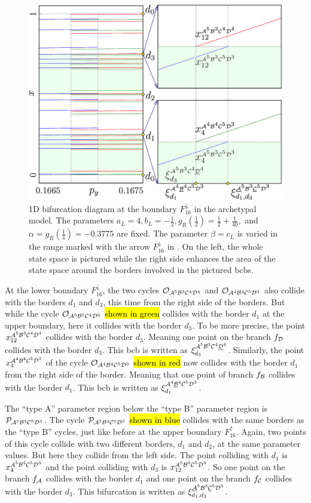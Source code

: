 \begin{figure}
	\centering
	\includegraphics[width=.7 \textwidth]{../Figures/6/6.7/result.png}
	\caption[1D bifurcation diagram at the boundary $F_{16}^\downarrow$ in the archetypal model]{
		1D bifurcation diagram at the boundary $F_{16}^\downarrow$ in the archetypal model.
		The parameters $a_L = 4, b_L = -\frac{1}{2}, g_R\left(\frac{1}{2}\right) = \frac{1}{2} + \frac{1}{40},$ and $\alpha = g_R\left(\frac{1}{4}\right) = -0.3775$ are fixed.
		The parameter $\beta = c_L$ is varied in the range marked with the arrow $F_{16}^\downarrow$ in .
		On the left, the whole state space is pictured while the right side enhances the area of the state space around the borders involved in the pictured \glspl{bcb}.
	}
	\label{fig:arch.bif.F.down}
\end{figure}

At the lower boundary $F_{16}^\downarrow$, the two cycles $\mathcal{O}_{\mathcal{A}^5\mathcal{B}^3\mathcal{C}^4\mathcal{D}^4}$ and $\mathcal{O}_{\mathcal{A}^4\mathcal{B}^4\mathcal{C}^5\mathcal{D}^3}$ also collide with the borders $d_1$ and $d_3$, this time from the right side of the borders.
But while the cycle $\mathcal{O}_{\mathcal{A}^5\mathcal{B}^5\mathcal{C}^4\mathcal{D}^4}$ \hl{shown in green} collides with the border $d_1$ at the upper boundary, here it collides with the border $d_3$.
To be more precise, the point $x_{12}^{\mathcal{A}^5\mathcal{B}^3\mathcal{C}^4\mathcal{D}^4}$ collides with the border $d_3$.
Meaning one point on the branch $f_{\mathcal{D}}$ collides with the border $d_3$.
This \gls{bcb} is written as $\xi_{d_3}^{\mathcal{A}^5\mathcal{B}^3\mathcal{C}^4\underline{\mathcal{D}}^4}$.
Similarly, the point $x_{4}^{\mathcal{A}^4\mathcal{B}^4\mathcal{C}^5\mathcal{D}^3}$ of the cycle $\mathcal{O}_{\mathcal{A}^4\mathcal{B}^4\mathcal{C}^5\mathcal{D}^3}$ \hl{shown in red} now collides with the border $d_1$ from the right side of the border.
Meaning that one point of branch $f_{\mathcal{B}}$ collides with the border $d_1$.
This \gls{bcb} is written as $\xi_{d_1}^{\mathcal{A}^4\underline{\mathcal{B}}^4\mathcal{C}^5\mathcal{D}^3}$.

The ``type A'' parameter region below the ``type B'' parameter region is $\mathcal{P}_{\mathcal{A}^5\mathcal{B}^3\mathcal{C}^5\mathcal{D}^3}$.
The cycle $\mathcal{P}_{\mathcal{A}^5\mathcal{B}^3\mathcal{C}^5\mathcal{D}^3}$ \hl{shown in blue} collides with the same borders as the ``type B'' cycles, just like before at the upper boundary $F_{16}^\uparrow$.
Again, two points of this cycle collide with two different borders, $d_1$ and $d_2$, at the same parameter values.
But here they collide from the left side.
The point colliding with $d_1$ is $x_{4}^{A^5\mathcal{B}^3\mathcal{C}^5\mathcal{D}^3}$ and the point colliding with $d_3$ is $x_{12}^{A^5\mathcal{B}^3\mathcal{C}^5\mathcal{D}^3}$.
So one point on the branch $f_{\mathcal{A}}$ collides with the border $d_1$ and one point on the branch $f_{\mathcal{C}}$ collides with the border $d_3$.
This bifurcation is written as $\xi_{d_1, d_3}^{\underline{\mathcal{A}}^5\mathcal{B}^3\underline{\mathcal{C}}^5\mathcal{D}^3}$.

